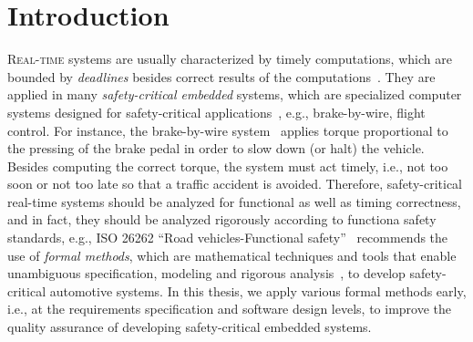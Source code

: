 \chapter{Introduction}\label{chapter_introduction}
\lettrine{R}{eal-time} systems are usually characterized by timely computations, which are bounded by \textit{deadlines} besides correct results of the computations~\cite{Buttazzo2003}. They are applied in many \textit{safety-critical embedded} systems, which are specialized computer systems designed for safety-critical applications~\cite{WangJiacun2017RES}, e.g., brake-by-wire, flight control. For instance, the brake-by-wire system~\cite{bibid} applies torque proportional to the pressing of the brake pedal in order to slow down (or halt) the vehicle. Besides computing the correct torque, the system must act timely, i.e., not too soon or not too late so that a traffic accident is avoided. Therefore, safety-critical real-time systems should be analyzed for functional as well as timing correctness, and in fact, they should be analyzed rigorously according to functiona safety standards, e.g., ISO 26262 ``Road vehicles-Functional safety''~\cite{iso201126262} recommends the use of \textit{formal methods}, which are mathematical techniques and tools that enable unambiguous specification, modeling and rigorous analysis~\cite{o2017concise}, to develop safety-critical automotive systems. In this thesis, we apply various formal methods early, i.e., at the requirements specification and software design levels, to improve the quality assurance of developing safety-critical embedded systems.

